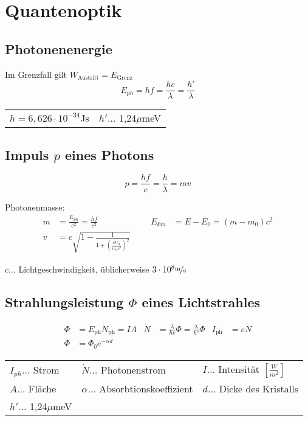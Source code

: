 \chapter{Quantenoptik}
	\section{Photonenenergie}
		Im Grenzfall gilt $W_{\mathrm{Austritt}} = E_{\mathrm{Grenz}}$
		\[ E_{ph} = h f = \frac{hc}{\lambda} = \frac{h'}{\lambda} \]
		\begin{table}[h]
		\begin{tabular}{ll}
		$h=6,626\cdot10^{-34}$Js & $h'\dots$ 1,24$\mu$meV\\
		\end{tabular}
		\end{table}
		
	\section{Impuls $p$ eines Photons}
		\[p = \frac{hf}{c} = \frac{h}{\lambda} = m v\]
		
		Photonenmasse:
		\begin{align*}
			m &= \frac{E_{ph}}{c^2} = \frac{hf}{c^2} &&& E_{kin} &= E - E_0 = (m - m_0)c^2 \\
			v &= c \sqrt{1-\frac{1}{1+(\frac{eU_A}{m_o c^2})^2}} &&&
		\end{align*}
		
		$c\dots$ Lichtgeschwindigkeit, üblicherweise $3\cdot10^8\nicefrac{\mathrm{m}}{\mathrm{s}}$
		
	\section{Strahlungsleistung $\Phi$ eines Lichtstrahles}
		\begin{align*}
			\Phi &= E_{\mathrm{ph}} \dot{N}_{\mathrm{ph}} = IA 
			& \dot{N} &= \frac{\lambda}{hc} \Phi = \frac{\lambda}{h'} \Phi 
			& I_{\mathrm{ph}} &= e\dot{N} \\
			\Phi & = \Phi_0 \mathrm{e}^{-\alpha d} 
		\end{align*}
		
		\begin{table}[h]
		\begin{tabular}{lll}
		$I_{ph}\dots$ Strom & $\dot{N}\dots$ Photonenstrom & $I\dots$ Intensität $\left[\frac{W}{m^2}\right]$ \\
		$A\dots$ Fläche & $\alpha\dots$ Absorbtionskoeffizient & $d\dots$ Dicke des Kristalls\\
		$h'\dots$ 1,24$\mu$meV\\
		\end{tabular}
		\end{table}
		
